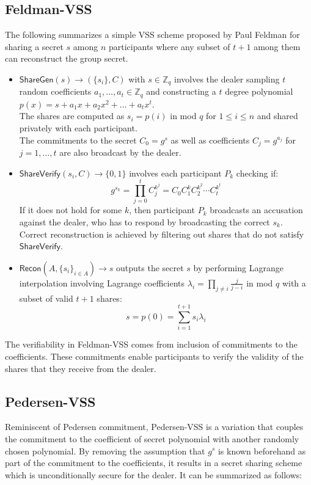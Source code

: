 \documentclass[letterpaper,twocolumn,10pt]{article}
\theoremstyle{definition}
\theoremstyle{remark}
\begin{document}
\subsection{Feldman-VSS}
\label{appendix:feldmanVSS}
The following summarizes a simple VSS scheme proposed by Paul Feldman for sharing a secret $s$ among $n$ participants where any subset of $t+1$ among them can reconstruct the group secret.
\begin{itemize}
    \item $\mathsf{ShareGen}(s) \rightarrow (\{s_i\}, C)$ with $s \in \mathbb{Z}_q$ involves the dealer sampling $t$ random coefficients $a_1, \ldots, a_t \in \mathbb{Z}_q$ and constructing a $t$ degree polynomial $p(x) = s + a_1x+ a_2x^2 +\ldots+a_tx^t$.\\
    The shares are computed as $s_i = p(i)$ in mod $q$ for $1\le i \le n$ and shared privately with each participant.\\
    The commitments to the secret $C_0 = g^s$ as well as coefficients $C_j = g^{a_j}$ for $j = 1,\ldots,t$ are also broadcast by the dealer.
    
    \item $\mathsf{ShareVerify}(s_i, C) \rightarrow \{0, 1\}$ involves each participant $P_k$  checking if:
    $$g^{s_k} = \prod_{j = 0}^{t } C_j^{k^j} = C_0 C_1^k C_2^{k^2} \cdots C_{t }^{k^{t }}$$
     If it does not hold for some $k$, then participant $P_k$ broadcasts an accusation against the dealer, who has to respond by broadcasting the correct $s_k$. \\
     Correct reconstruction is achieved by filtering out shares that do not satisfy $\mathsf{ShareVerify}$.
    \item $\mathsf{Recon}(A, \{s_i\}_{i \in A}) \rightarrow s$ outputs the secret $s$ by performing  Lagrange interpolation involving Lagrange coefficients $\lambda_i = \prod_{j \neq i} \frac{j}{j - i}$ in mod $q$ with a subset of valid $t+1$ shares:
    $$s = p(0) = \sum_{i = 1}^{t+1} s_i \lambda_i$$
\end{itemize}

The verifiability in Feldman-VSS comes from inclusion of commitments to the coefficients. These commitments enable participants to verify the validity of the shares that they receive from the dealer.

\subsection{Pedersen-VSS}
\label{appendix:pedersenVSS}
Reminiscent of Pedersen commitment, Pedersen-VSS is a variation that couples the commitment to the coefficient of secret polynomial with another randomly chosen polynomial. By removing the assumption that $g^s$ is known beforehand as part of the commitment to the coefficients, it results in a secret sharing scheme which is unconditionally secure for the dealer. It can be summarized as follows:
\end{document}
